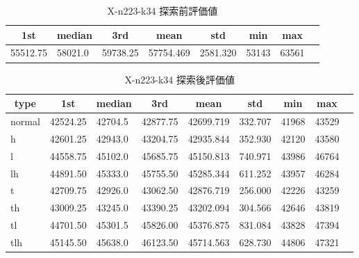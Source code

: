 \begin{table}[htbp]
    \caption{X-n223-k34 探索前評価値}
    \begin{tabular}{|l|l|l|l|l|l|l|l|}\hline
    \multicolumn{1}{|c|}{\textbf{1st}}
    &\multicolumn{1}{c|}{\textbf{median}}
    &\multicolumn{1}{c|}{\textbf{3rd}}
    &\multicolumn{1}{c|}{\textbf{mean}}
    &\multicolumn{1}{c|}{\textbf{std}}
    &\multicolumn{1}{c|}{\textbf{min}}
    &\multicolumn{1}{c|}{\textbf{max}}\\\hline
	55512.75 & 58021.0 & 59738.25 & 57754.469 & 2581.320 & 53143 & 63561\\\hline
	\end{tabular}
\end{table}
\begin{table}[htbp]
    \caption{X-n223-k34 探索後評価値}
    \begin{tabular}{|l|l|l|l|l|l|l|l|l|}\hline
    \multicolumn{1}{|c|}{\textbf{type}}
    &\multicolumn{1}{|c|}{\textbf{1st}}
    &\multicolumn{1}{c|}{\textbf{median}}
    &\multicolumn{1}{c|}{\textbf{3rd}}
    &\multicolumn{1}{c|}{\textbf{mean}}
    &\multicolumn{1}{c|}{\textbf{std}}
    &\multicolumn{1}{c|}{\textbf{min}}
    &\multicolumn{1}{c|}{\textbf{max}}\\\hline
	normal & 42524.25 & 42704.5 & 42877.75 & 42699.719 & 332.707 & 41968 & 43529\\\hline
	h & 42601.25 & 42943.0 & 43204.75 & 42935.844 & 352.930 & 42120 & 43580\\\hline
	l & 44558.75 & 45102.0 & 45685.75 & 45150.813 & 740.971 & 43986 & 46764\\\hline
	lh & 44891.50 & 45333.0 & 45755.50 & 45285.344 & 611.252 & 43957 & 46284\\\hline
	t & 42709.75 & 42926.0 & 43062.50 & 42876.719 & 256.000 & 42226 & 43259\\\hline
	th & 43009.25 & 43245.0 & 43390.25 & 43202.094 & 304.566 & 42646 & 43819\\\hline
	tl & 44701.50 & 45301.5 & 45826.00 & 45376.875 & 831.084 & 43828 & 47394\\\hline
	tlh & 45145.50 & 45638.0 & 46123.50 & 45714.563 & 628.730 & 44806 & 47321\\\hline
	\end{tabular}
\end{table}
